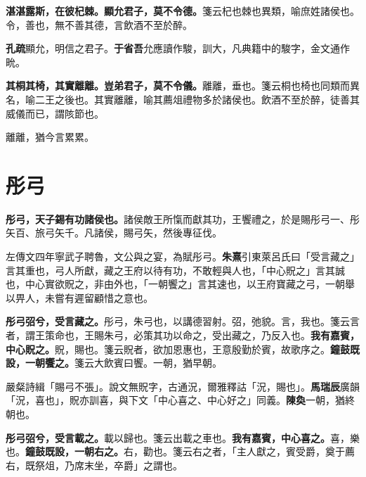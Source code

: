 \textbf{湛湛露斯，在彼杞棘。顯允君子，莫不令德。}{\footnotesize 箋云杞也棘也異類，喻庶姓諸侯也。令，善也，無不善其德，言飲酒不至於醉。}

\begin{quoting}\textbf{孔疏}顯允，明信之君子。\textbf{于省吾}允應讀作駿，訓大，凡典籍中的駿字，金文通作㽙。\end{quoting}

\textbf{其桐其椅，其實離離。豈弟君子，莫不令儀。}{\footnotesize 離離，垂也。箋云桐也椅也同類而異名，喻二王之後也。其實離離，喻其薦俎禮物多於諸侯也。飲酒不至於醉，徒善其威儀而已，謂陔節也。}

\begin{quoting}離離，猶今言累累。\end{quoting}

\section{彤弓}


\textbf{彤弓，天子錫有功諸侯也。}{\footnotesize 諸侯敵王所愾而獻其功，王饗禮之，於是賜彤弓一、彤矢百、旅弓矢千。凡諸侯，賜弓矢，然後專征伐。}

\begin{quoting}左傳文四年寧武子聘魯，文公與之宴，為賦彤弓。\textbf{朱熹}引東萊呂氏曰「受言藏之」言其重也，弓人所獻，藏之王府以待有功，不敢輕與人也，「中心貺之」言其誠也，中心實欲貺之，非由外也，「一朝饗之」言其速也，以王府寶藏之弓，一朝舉以畀人，未嘗有遲留顧惜之意也。\end{quoting}

\textbf{彤弓弨兮，受言藏之。}{\footnotesize 彤弓，朱弓也，以講德習射。弨，弛貌。言，我也。箋云言者，謂王策命也，王賜朱弓，必策其功以命之，受出藏之，乃反入也。}\textbf{我有嘉賓，中心貺之。}{\footnotesize 貺，賜也。箋云貺者，欲加恩惠也，王意殷勤於賓，故歌序之。}\textbf{鐘鼓既設，一朝饗之。}{\footnotesize 箋云大飲賓曰饗。一朝，猶早朝。}

\begin{quoting}嚴粲詩緝「賜弓不張」。說文無貺字，古通況，爾雅釋詁「況，賜也」。\textbf{馬瑞辰}廣韻「況，喜也」，貺亦訓喜，與下文「中心喜之、中心好之」同義。\textbf{陳奐}一朝，猶終朝也。\end{quoting}

\textbf{彤弓弨兮，受言載之。}{\footnotesize 載以歸也。箋云出載之車也。}\textbf{我有嘉賓，中心喜之。}{\footnotesize 喜，樂也。}\textbf{鐘鼓既設，一朝右之。}{\footnotesize 右，勸也。箋云右之者，「主人獻之，賓受爵，奠于薦右，既祭俎，乃席末坐，卒爵」之謂也。}

